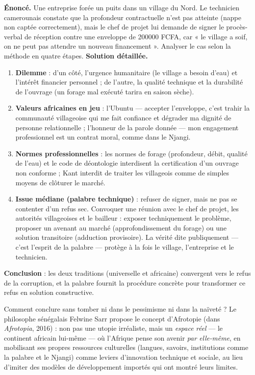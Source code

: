 \documentclass[11pt]{article}
\newcommand{\cle}[1]{{\popxbold\color{popdark}#1}}
\newcounter{popsec}
\newcounter{popsub}
\newcommand{\courssub}[1]{%
  \stepcounter{popsub}%
  \par\vspace{9pt}\noindent{\popxbold\fontsize{11.5}{13}\selectfont\color{popink}{\color{poporange}\thepopsec.\thepopsub}\hspace{6pt}#1}\par\nopagebreak\vspace{4pt}
}
\begin{document}
\begin{exoresolu}
\textbf{Énoncé.} Une entreprise forée un puits dans un village du Nord. Le technicien camerounais constate que la profondeur contractuelle n'est pas atteinte (nappe non captée correctement), mais le chef de projet lui demande de signer le procès-verbal de réception contre une enveloppe de \num{200000} FCFA, car « le village a soif, on ne peut pas attendre un nouveau financement ». Analyser le cas selon la méthode en quatre étapes.
\tcblower
\textbf{Solution détaillée.}
\begin{enumerate}
\item \textbf{Dilemme} : d'un côté, l'urgence humanitaire (le village a besoin d'eau) et l'intérêt financier personnel ; de l'autre, la qualité technique et la durabilité de l'ouvrage (un forage mal exécuté tarira en saison sèche).
\item \textbf{Valeurs africaines en jeu} : l'Ubuntu — accepter l'enveloppe, c'est trahir la communauté villageoise qui me fait confiance et dégrader ma dignité de personne relationnelle ; l'honneur de la parole donnée — mon engagement professionnel est un contrat moral, comme dans le Njangi.
\item \textbf{Normes professionnelles} : les normes de forage (profondeur, débit, qualité de l'eau) et le code de déontologie interdisent la certification d'un ouvrage non conforme ; Kant interdit de traiter les villageois comme de simples moyens de clôturer le marché.
\item \textbf{Issue médiane (palabre technique)} : refuser de signer, mais ne pas se contenter d'un refus sec. Convoquer une réunion avec le chef de projet, les autorités villageoises et le bailleur : exposer techniquement le problème, proposer un avenant au marché (approfondissement du forage) ou une solution transitoire (adduction provisoire). La vérité dite publiquement — c'est l'esprit de la palabre — protège à la fois le village, l'entreprise et le technicien.
\end{enumerate}
\textbf{Conclusion} : les deux traditions (universelle et africaine) convergent vers le refus de la corruption, et la palabre fournit la procédure concrète pour transformer ce refus en solution constructive.
\end{exoresolu}

\courssub{Perspective : l'« Afrotopie » de Felwine Sarr}

Comment conclure sans tomber ni dans le pessimisme ni dans la naïveté ? Le philosophe sénégalais \cle{Felwine Sarr} propose le concept d'\cle{Afrotopie} (dans \emph{Afrotopia}, 2016) : non pas une utopie irréaliste, mais un \emph{espace réel} — le continent africain lui-même — où l'Afrique pense son avenir \emph{par elle-même}, en mobilisant ses propres ressources culturelles (langues, savoirs, institutions comme la palabre et le Njangi) comme leviers d'innovation technique et sociale, au lieu d'imiter des modèles de développement importés qui ont montré leurs limites.
\end{document}
